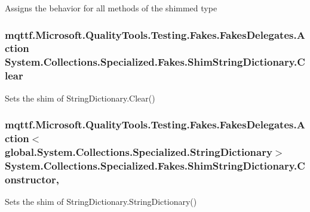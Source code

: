 Assigns the behavior for all methods of the shimmed type

\hypertarget{class_system_1_1_collections_1_1_specialized_1_1_fakes_1_1_shim_string_dictionary_a349e780a50ac03c08a462988bb87b57b}{
\subsubsection[{Clear}]{\setlength{\rightskip}{0pt plus 5cm}mqttf.\-Microsoft.\-Quality\-Tools.\-Testing.\-Fakes.\-Fakes\-Delegates.\-Action System.\-Collections.\-Specialized.\-Fakes.\-Shim\-String\-Dictionary.\-Clear\hspace{0.3cm}{\ttfamily [set]}}}\label{class_system_1_1_collections_1_1_specialized_1_1_fakes_1_1_shim_string_dictionary_a349e780a50ac03c08a462988bb87b57b}


Sets the shim of String\-Dictionary.\-Clear()

\hypertarget{class_system_1_1_collections_1_1_specialized_1_1_fakes_1_1_shim_string_dictionary_a9a016ab9f496d194642e6d54dc61fc1c}{
\subsubsection[{Constructor}]{\setlength{\rightskip}{0pt plus 5cm}mqttf.\-Microsoft.\-Quality\-Tools.\-Testing.\-Fakes.\-Fakes\-Delegates.\-Action$<$global.\-System.\-Collections.\-Specialized.\-String\-Dictionary$>$ System.\-Collections.\-Specialized.\-Fakes.\-Shim\-String\-Dictionary.\-Constructor\hspace{0.3cm}{\ttfamily [static]}, {\ttfamily [set]}}}\label{class_system_1_1_collections_1_1_specialized_1_1_fakes_1_1_shim_string_dictionary_a9a016ab9f496d194642e6d54dc61fc1c}


Sets the shim of String\-Dictionary.\-String\-Dictionary()

